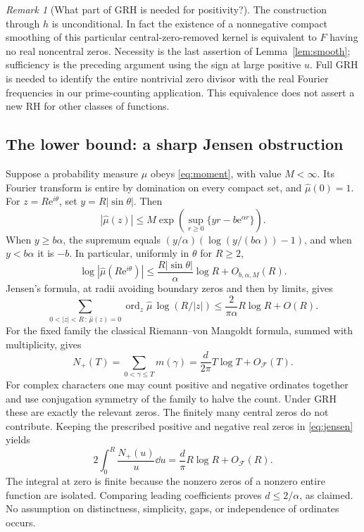 \documentclass[11pt]{article}
\theoremstyle{remark}\newtheorem{remark}[theorem]{Remark}
\newcommand{\ee}{\mathrm e}\newcommand{\abs}[1]{\lvert#1\rvert}
\newcommand{\spec}{\mathcal F}
\DeclareMathOperator{\ord}{ord}
\begin{document}
\begin{remark}[What part of GRH is needed for positivity?]
The construction through $h$ is unconditional. In fact the existence of a nonnegative compact smoothing of this particular central-zero-removed kernel is equivalent to $F$ having no real noncentral zeros. Necessity is the last assertion of Lemma~\ref{lem:smooth}; sufficiency is the preceding argument using the sign at large positive $u$. Full GRH is needed to identify the entire nontrivial zero divisor with the real Fourier frequencies in our prime-counting application. This equivalence does not assert a new RH for other classes of functions.
\end{remark}

\subsection{The lower bound: a sharp Jensen obstruction}
Suppose a probability measure $\mu$ obeys \eqref{eq:moment}, with value $M<\infty$. Its Fourier transform is entire by domination on every compact set, and $\widehat\mu(0)=1$. For $z=R\ee^{i\theta}$, set $y=R|\sin\theta|$. Then
\[
 |\widehat\mu(z)|\le M\exp\left(\sup_{r\ge0}\{yr-b\ee^{\alpha r}\}\right).
\]
When $y\ge b\alpha$, the supremum equals $(y/\alpha)(\log(y/(b\alpha))-1)$, and when $y<b\alpha$ it is $-b$. In particular, uniformly in $\theta$ for $R\ge2$,
\begin{equation}\label{eq:growth}
 \log|\widehat\mu(R\ee^{i\theta})|\le \frac{R|\sin\theta|}{\alpha}\log R+O_{b,\alpha,M}(R).
\end{equation}
Jensen's formula, at radii avoiding boundary zeros and then by limits, gives
\begin{equation}\label{eq:jensen}
 \sum_{0<|z|<R\, :\,\widehat\mu(z)=0}\ord_z\widehat\mu\,\log(R/|z|)
 \le \frac{2}{\pi\alpha}R\log R+O(R).
\end{equation}
For the fixed family the classical Riemann--von Mangoldt formula, summed with multiplicity, gives
\[
 N_+(T)=\sum_{0<\gamma\le T}m(\gamma)=\frac{d}{2\pi}T\log T+O_{\spec}(T).
\]
For complex characters one may count positive and negative ordinates together and use conjugation symmetry of the family to halve the count. Under GRH these are exactly the relevant zeros. The finitely many central zeros do not contribute. Keeping the prescribed positive and negative real zeros in \eqref{eq:jensen} yields
\[
 2\int_0^R\frac{N_+(u)}u\dd u=\frac{d}{\pi}R\log R+O_{\spec}(R).
\]
The integral at zero is finite because the nonzero zeros of a nonzero entire function are isolated. Comparing leading coefficients proves $d\le 2/\alpha$, as claimed. No assumption on distinctness, simplicity, gaps, or independence of ordinates occurs.
\end{document}
